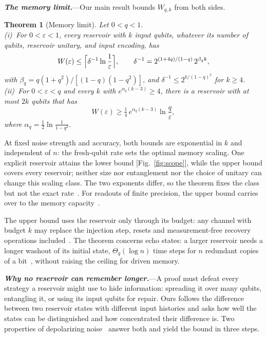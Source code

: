 \documentclass[aps,prl,twocolumn,superscriptaddress,floatfix]{revtex4-2}
\theoremstyle{plain}
\newtheorem{theorem}{Theorem}
\newcommand{\runin}[1]{\textit{\textbf{#1}}---}
\begin{document}
\runin{The memory limit.}Our main result bounds $W_{q,k}$ from both sides.

\begin{theorem}[Memory limit]\label{thm:main}
Let $0<q<1$.\\[2pt]
(i)~For $0<\varepsilon<1$, every reservoir with $k$ input qubits, whatever its number of qubits, reservoir unitary, and input encoding, has
\begin{equation}
W(\varepsilon)\le\Bigl\lceil\delta^{-1}\ln\frac1\varepsilon\Bigr\rceil,\qquad\delta^{-1}=2^{(1+4q)/(1-q)}\,2^{\beta_qk},
\label{eq:upper}
\end{equation}
with $\beta_q=q(1+q^2)/[(1-q)(1-q^2)]$, and \mbox{$\delta^{-1}\le2^{k/(1-q)^2}$} for $k\ge4$.\\[2pt]
(ii)~For $0<\varepsilon<q$ and every $k$ with $e^{\alpha_q(k-3)}\ge4$, there is a reservoir with at most $2k$ qubits that has
\begin{equation}
W(\varepsilon)\ge\tfrac14\,e^{\alpha_q(k-3)}\ln\frac q\varepsilon ,
\label{eq:lower}
\end{equation}
where $\alpha_q=\frac12\ln\frac1{1-q^2}$.
\end{theorem}

At fixed noise strength and accuracy, both bounds are exponential in $k$ and independent of $n$: the fresh-qubit rate sets the optimal memory scaling. One explicit reservoir attains the lower bound [Fig.~\ref{fig:scope}], while the upper bound covers every reservoir; neither size nor entanglement nor the choice of unitary can change this scaling class. The two exponents differ, so the theorem fixes the class but not the exact rate~\cite[Sec.~III\,G]{SM}. For readouts of finite precision, the upper bound carries over to the memory capacity~\citetext{\citealp[Sec.~III\,F]{SM}; \citealp{Jaeger2002}}.

The upper bound uses the reservoir only through its budget: any channel with budget $k$ may replace the injection step, resets and measurement-free recovery operations included~\cite[Sec.~VI]{SM}. The theorem concerns echo states: a larger reservoir needs a longer washout of its initial state, $\Theta_q(\log n)$ time steps for $n$ redundant copies of a bit~\cite[Sec.~IV]{SM}, without raising the ceiling for driven memory.

\runin{Why no reservoir can remember longer.}A proof must defeat every strategy a reservoir might use to hide information: spreading it over many qubits, entangling it, or using its input qubits for repair. Ours follows the difference between two reservoir states with different input histories and asks how well the states can be distinguished and how concentrated their difference is. Two properties of depolarizing noise~\cite{King2014,Cubitt2015} answer both and yield the bound in three steps.
\end{document}
